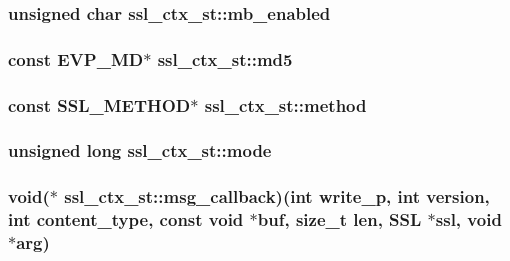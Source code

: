 \hypertarget{structssl__ctx__st_abc0c02aa09e6c749fe5728ef22860dba}{
\subsubsection[{mb\-\_\-enabled}]{\setlength{\rightskip}{0pt plus 5cm}unsigned char ssl\-\_\-ctx\-\_\-st\-::mb\-\_\-enabled}}\label{structssl__ctx__st_abc0c02aa09e6c749fe5728ef22860dba}
\hypertarget{structssl__ctx__st_a0d2c62fc7903597eef4c4890ba327a16}{
\subsubsection[{md5}]{\setlength{\rightskip}{0pt plus 5cm}const E\-V\-P\-\_\-\-M\-D$\ast$ ssl\-\_\-ctx\-\_\-st\-::md5}}\label{structssl__ctx__st_a0d2c62fc7903597eef4c4890ba327a16}
\hypertarget{structssl__ctx__st_a9e4773d3ec5b1a80abab92390015c576}{
\subsubsection[{method}]{\setlength{\rightskip}{0pt plus 5cm}const {\bf S\-S\-L\-\_\-\-M\-E\-T\-H\-O\-D}$\ast$ ssl\-\_\-ctx\-\_\-st\-::method}}\label{structssl__ctx__st_a9e4773d3ec5b1a80abab92390015c576}
\hypertarget{structssl__ctx__st_a15675b65ff5a91cc12c75247cec9c90e}{
\subsubsection[{mode}]{\setlength{\rightskip}{0pt plus 5cm}unsigned long ssl\-\_\-ctx\-\_\-st\-::mode}}\label{structssl__ctx__st_a15675b65ff5a91cc12c75247cec9c90e}
\hypertarget{structssl__ctx__st_ad1c45e5a8d465d42f89a9f0d4a991dcd}{
\subsubsection[{msg\-\_\-callback}]{\setlength{\rightskip}{0pt plus 5cm}void($\ast$ ssl\-\_\-ctx\-\_\-st\-::msg\-\_\-callback)(int write\-\_\-p, int version, int content\-\_\-type, const void $\ast$buf, size\-\_\-t len, S\-S\-L $\ast$ssl, void $\ast$arg)}}\label{structssl__ctx__st_ad1c45e5a8d465d42f89a9f0d4a991dcd}
